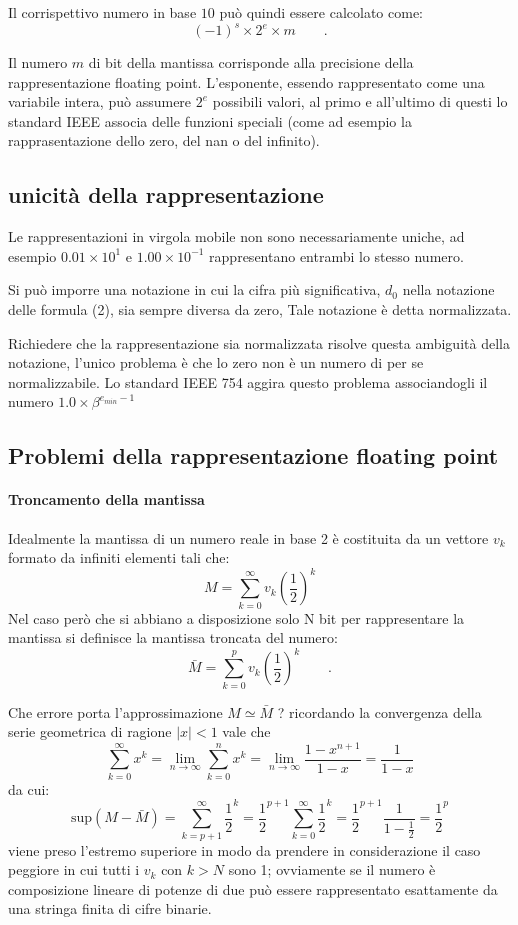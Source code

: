 \documentclass{article}
\begin{document}
Il corrispettivo numero in base $10$ può quindi essere calcolato come:
	\begin{equation}
	(-1)^{s} \times 2^{e} \times m \qquad .
	\end{equation}

Il numero $m$ di bit della mantissa corrisponde alla precisione della rappresentazione floating point.
L'esponente, essendo rappresentato come una variabile intera, può assumere $2^{e}$ possibili valori, al primo e all'ultimo di questi lo standard IEEE associa delle funzioni speciali (come ad esempio la rapprasentazione dello zero, del nan o del infinito).

\subsection{unicità della rappresentazione}
Le rappresentazioni in virgola mobile non sono necessariamente uniche, ad esempio $0.01 \times 10^{1}$ e $1.00 \times 10^{-1}$ rappresentano entrambi lo stesso numero.

Si può imporre una notazione in cui la cifra più significativa, $d_{0}$ nella notazione delle formula (2), sia sempre diversa da zero, Tale notazione è detta normalizzata.

Richiedere che la rappresentazione sia normalizzata risolve questa ambiguità della notazione, l'unico problema è che lo zero non è un numero di per se normalizzabile.
Lo standard IEEE 754 aggira questo problema associandogli il numero $1.0 \times \beta ^{e_{min}-1}$


\subsection{Problemi della rappresentazione floating point}

\paragraph{Troncamento della mantissa}

Idealmente la mantissa di un numero reale in base 2 è costituita da un vettore  $v_{k}$ formato da infiniti elementi tali che:
$$M= \sum_{k=0}^{\infty}v_{k}(\dfrac{1}{2})^{k}$$
Nel caso però che si abbiano a disposizione solo N bit per rappresentare la mantissa si definisce la mantissa troncata del numero:
$$\bar{M}=\sum_{k=0}^{p}v_{k}(\frac{1}{2})^{k} \qquad .$$

Che errore porta l'approssimazione $M\simeq\bar{M}$ ?
ricordando la convergenza della serie geometrica di ragione $\mid x \mid <1$ vale che
$$
\sum_{k=0}^{\infty}x^{k} =\lim_{n \rightarrow \infty}\sum_{k=0}^{n}x^{k}=\lim_{n \rightarrow \infty}\frac{1-x^{n+1}}{1-x}=\frac{1}{1-x}
$$
da cui:
	\begin{equation}
\textrm{sup}(M-\bar{M})= \sum_{k=p+1}^{\infty}\frac{1}{2}^{k} =\frac{1}{2}^{p+1}\sum_{k=0}^{\infty}\frac{1}{2}^{k}= \frac{1}{2}^{p+1}\frac{1}{1-\frac{1}{2}} =\frac{1}{2}^{p}
	\end{equation}
viene preso l'estremo superiore in modo da prendere in considerazione il caso peggiore  in cui tutti i $v_{k}$ con $k>N$ sono 1; ovviamente se il numero è composizione lineare di potenze di due può essere rappresentato esattamente da una stringa finita di cifre binarie.
\end{document}
